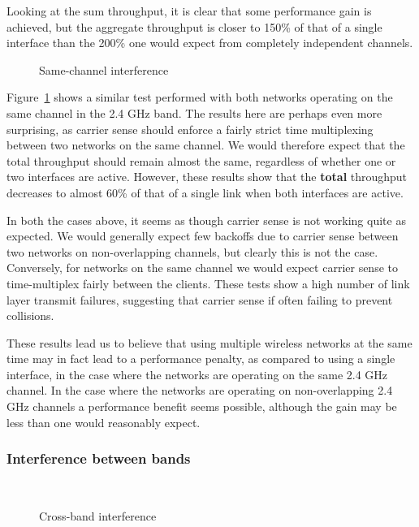 Looking at the sum throughput, it is clear that some performance gain is
achieved, but the aggregate throughput is closer to 150\% of that of a single
interface than the 200\% one would expect from completely independent channels.

\begin{figure}[h]
 \centering
 
 \caption{Same-channel interference}\label{graph:sc-interference}
\end{figure}

Figure~\ref{graph:sc-interference} shows a similar test performed with both
networks operating on the same channel in the 2.4 GHz band. The results here are
perhaps even more surprising, as carrier sense should enforce a fairly strict
time multiplexing between two networks on the same channel. We would therefore
expect that the total throughput should remain almost the same, regardless of
whether one or two interfaces are active. However, these results show that the
\textbf{total} throughput decreases to almost 60\% of that of a single link when
both interfaces are active.

In both the cases above, it seems as though carrier sense is not working quite
as expected. We would generally expect few backoffs due to carrier sense between
two networks on non-overlapping channels, but clearly this is not the case.
Conversely, for networks on the same channel we would expect carrier sense to
time-multiplex fairly between the clients. These tests show a high number of 
link layer transmit failures, suggesting that carrier sense if often failing 
to prevent collisions.

These results lead us to believe that using multiple wireless networks at the
same time may in fact lead to a performance penalty, as compared to using a
single interface, in the case where the networks are operating on the same 2.4
GHz channel. In the case where the networks are operating on non-overlapping 2.4
GHz channels a performance benefit seems possible, although the gain may be less
than one would reasonably expect.


\subsubsection{Interference between bands}

\begin{figure}[h]
 \centering
 \subfloat[][uplink] {\
   \label{graph:cb-interference-up}
 }
 \\
 \subfloat[][downlink] {\
   \label{graph:cb-interference-down}
 }
 \caption{Cross-band interference}
\end{figure}

